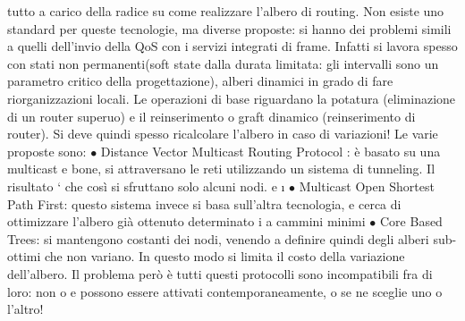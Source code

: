\documentclass[a4paper,12pt]{article}
\begin{document}
tutto a carico della radice su come realizzare l'albero di routing.
Non esiste uno standard per queste tecnologie, ma diverse proposte: si hanno
dei problemi simili a quelli dell'invio della QoS con i servizi integrati di frame.
Infatti si lavora spesso con stati non permanenti(soft state dalla durata limitata:
gli intervalli sono un parametro critico della progettazione), alberi dinamici
in grado di fare riorganizzazioni locali. Le operazioni di base riguardano la
potatura (eliminazione di un router superuo) e il reinserimento o graft dinamico
(reinserimento di router). Si deve quindi spesso ricalcolare l'albero in caso di
variazioni! Le varie proposte sono:
$\bullet$ Distance Vector Multicast Routing Protocol : è basato su una multicast
e
bone, si attraversano le reti utilizzando un sistema di tunneling. Il risultato
` che così si sfruttano solo alcuni nodi.
e
\i{}
$\bullet$ Multicast Open Shortest Path First: questo sistema invece si basa sull'altra tecnologia, e cerca di
ottimizzare l'albero già ottenuto determinato i
a
cammini minimi
$\bullet$ Core Based Trees: si mantengono costanti dei nodi, venendo a definire
quindi degli alberi sub-ottimi che non variano. In questo modo si limita il
costo della variazione dell'albero.
Il problema però è tutti questi protocolli sono incompatibili fra di loro: non
o e
possono essere attivati contemporaneamente, o se ne sceglie uno o l'altro!
\end{document}
